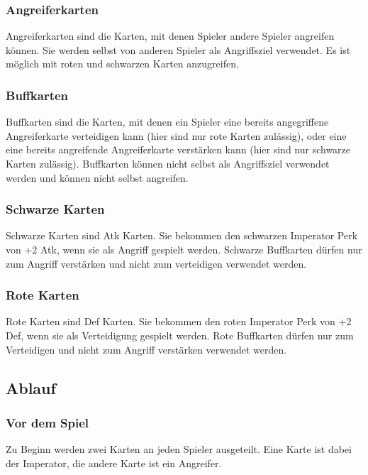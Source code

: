 \documentclass[a4paper,12pt]{article}
\numberwithin{equation}{section}
\begin{document}
\subsubsection{Angreiferkarten}
Angreiferkarten sind die Karten, mit denen Spieler andere Spieler angreifen können.
Sie werden selbst von anderen Spieler als Angriffsziel verwendet.
Es ist möglich mit roten und schwarzen Karten anzugreifen.

\subsubsection{Buffkarten}
Buffkarten sind die Karten, mit denen ein Spieler eine bereits angegriffene Angreiferkarte verteidigen kann (hier sind nur rote Karten zulässig), oder eine eine bereits angreifende Angreiferkarte verstärken kann (hier sind nur schwarze Karten zulässig).
Buffkarten können nicht selbst als Angriffsziel verwendet werden und können nicht selbst angreifen.

\subsubsection{Schwarze Karten}
Schwarze Karten sind Atk Karten.
Sie bekommen den schwarzen Imperator Perk von +2 Atk, wenn sie als Angriff gespielt werden.
Schwarze Buffkarten dürfen nur zum Angriff verstärken und nicht zum verteidigen verwendet werden.

\subsubsection{Rote Karten}
Rote Karten sind Def Karten.
Sie bekommen den roten Imperator Perk von +2 Def, wenn sie als Verteidigung gespielt werden.
Rote Buffkarten dürfen nur zum Verteidigen und nicht zum Angriff verstärken verwendet werden.

\subsection{Ablauf}
\subsubsection{Vor dem Spiel}
Zu Beginn werden zwei Karten an jeden Spieler ausgeteilt.
Eine Karte ist dabei der Imperator, die andere Karte ist ein Angreifer.
\end{document}
